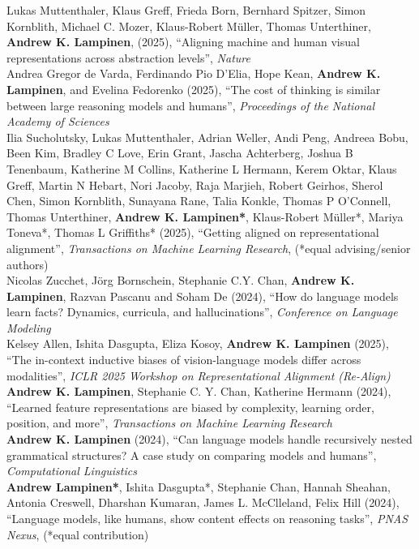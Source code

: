 \documentclass[margin]{res}
\begin{document}
\begin{resume}
Lukas Muttenthaler, Klaus Greff, Frieda Born, Bernhard Spitzer, Simon Kornblith, Michael C. Mozer, Klaus-Robert M{\"u}ller, Thomas Unterthiner, \textbf{Andrew K. Lampinen}, (2025), {``Aligning machine and human visual representations across abstraction levels'',} \textit{Nature}\\[5pt]
Andrea Gregor de Varda, Ferdinando Pio D'Elia, Hope Kean, \textbf{Andrew K. Lampinen}, and Evelina Fedorenko (2025), {``The cost of thinking is similar between large reasoning models and humans''}, \textit{Proceedings of the National Academy of Sciences}\\[5pt]
Ilia Sucholutsky, Lukas Muttenthaler, Adrian Weller, Andi Peng, Andreea Bobu, Been Kim, Bradley C Love, Erin Grant, Jascha Achterberg, Joshua B Tenenbaum, Katherine M Collins, Katherine L Hermann, Kerem Oktar, Klaus Greff, Martin N Hebart, Nori Jacoby, Raja Marjieh, Robert Geirhos, Sherol Chen, Simon Kornblith, Sunayana Rane, Talia Konkle, Thomas P O'Connell, Thomas Unterthiner, \textbf{Andrew K. Lampinen*}, Klaus-Robert M{\"u}ller*, Mariya Toneva*, Thomas L Griffiths* (2025), {``Getting aligned on representational alignment'',} \textit{Transactions on Machine Learning Research}, (*equal advising/senior authors) \\[5pt]
Nicolas Zucchet, J{\"o}rg Bornschein, Stephanie C.Y. Chan, \textbf{Andrew K. Lampinen}, Razvan Pascanu and Soham De (2024), {``How do language models learn facts? Dynamics, curricula, and hallucinations''}, \textit{Conference on Language Modeling}\\[5pt]
Kelsey Allen, Ishita Dasgupta, Eliza Kosoy, \textbf{Andrew K. Lampinen} (2025), {``The in-context inductive biases of vision-language models differ across modalities''}, \textit{ICLR 2025 Workshop on Representational Alignment (Re-Align)}\\[5pt]
\textbf{Andrew K. Lampinen}, Stephanie C. Y. Chan, Katherine Hermann (2024), {``Learned feature representations are biased by complexity, learning order, position, and more'',} \textit{Transactions on Machine Learning Research} \\[5pt]
\textbf{Andrew K. Lampinen} (2024), {``Can language models handle recursively nested grammatical structures? A case study on comparing models and humans'',} \textit{Computational Linguistics} \\[5pt]
\textbf{Andrew Lampinen*}, Ishita Dasgupta*, Stephanie Chan, Hannah Sheahan, Antonia Creswell, Dharshan Kumaran, James L. McClleland, Felix Hill (2024), {``Language models, like humans, show content effects on reasoning tasks'',} \textit{PNAS Nexus}, (*equal contribution) \\[5pt] 

\end{resume}
\end{document}
